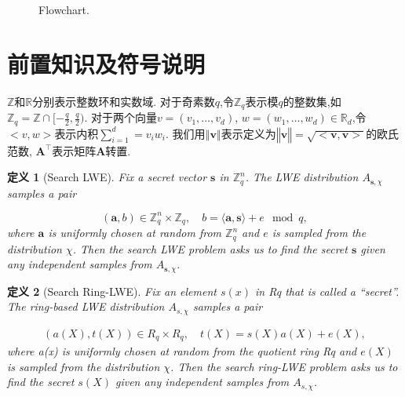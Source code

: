 \documentclass[12pt,a4paper]{article}
\newtheorem{definition}{定义} %
\numberwithin{equation}{section}
\begin{document}
\begin{figure}[htbp]
\begin{center}
\begin{tikzpicture}



\end{tikzpicture}
    
\end{center}
    \caption{Flowchart.}
    \label{fig:flowchart}
\end{figure}




\section{前置知识及符号说明}
$\mathbb{Z}$和$\mathbb{R}$分别表示整数环和实数域.
对于奇素数$q$,令$\mathbb{Z}_q$表示模$q$的整数集,如$\mathbb{Z}_q = \mathbb{Z}\cap[-\frac{q}{2},\frac{q}{2})$.
对于两个向量$v =(v_1 , \ldots , v_d)$, $w = ( w_1 , \ldots , w_d) \in \mathbb{R}_d$,令$<v,w>$表示内积$ \sum_{i=1}^{d}= v_iw_i$.
我们用$‖\mathbf{v}‖$表示定义为$‖\mathbf{v}‖=\sqrt{<\mathbf{v},\mathbf{v}>}$的欧氏范数, $\mathbf{A}^\top$表示矩阵$\mathbf{A}$转置.

\begin{definition}[Search LWE]
Fix a secret vector $\mathbf{s}$ in $\mathbb{Z}_q^n$.  
The LWE distribution $A_{\mathbf{s},\chi}$ samples a pair  

\[
(\mathbf{a}, b) \in \mathbb{Z}_q^n \times \mathbb{Z}_q, \quad b = \langle \mathbf{a}, \mathbf{s} \rangle + e \mod q,
\]  
where $\mathbf{a}$ is uniformly chosen at random from $\mathbb{Z}_q^n$ and $e$ is sampled from the distribution $\chi$. Then the search LWE problem asks us to find the secret $\mathbf{s}$ given any independent samples from $A_{\mathbf{s},\chi}$.  
\end{definition}

\begin{definition}[Search Ring-LWE]
Fix an element $s(x)$ in Rq that is called a “secret”. 
The ring-based LWE distribution $A_{s,\chi}$ samples a pair

\begin{align*}
    (a(X), t(X)) \in R_q \times R_q, \quad t(X) = s(X)a(X) + e(X),
\end{align*}
where a(x) is uniformly chosen at random from the quotient ring Rq and $e(X)$ is sampled from the distribution $\chi$. Then the search ring-LWE problem asks us to find the secret $s(X)$ given any independent samples from $A_{s,\chi}$.
\end{definition}
\end{document}
